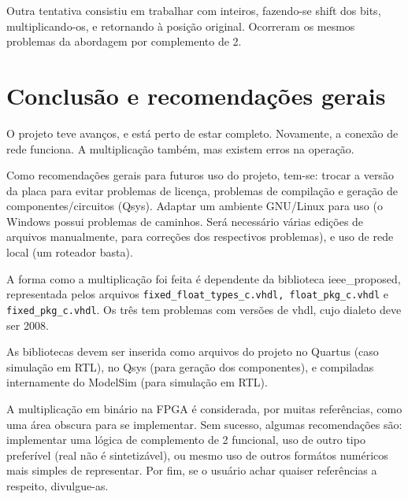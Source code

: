 \documentclass [12pt,oneside] {article}
\begin{document}
	Outra tentativa consistiu em trabalhar com inteiros,
fazendo-se shift dos bits, multiplicando-os, e retornando à posição
original. Ocorreram os mesmos problemas da abordagem por complemento
de 2.


\section{Conclusão e recomendações gerais}

	O projeto teve avanços, e está perto de estar completo.
Novamente, a conexão de rede funciona. A multiplicação também, mas
existem erros na operação.

	Como recomendações gerais para futuros uso do projeto, tem-se:
trocar a versão da placa para evitar problemas de licença, problemas
de compilação e geração de componentes/circuitos (Qsys). Adaptar um
ambiente GNU/Linux para uso (o Windows possui problemas de caminhos.
Será necessário várias edições de arquivos manualmente, para correções
dos respectivos problemas), e uso de rede local (um roteador basta).

	A forma como a multiplicação foi feita é dependente da
biblioteca ieee\_proposed, representada pelos arquivos
\texttt{fixed\_float\_types\_c.vhdl, float\_pkg\_c.vhdl} e
\texttt{fixed\_pkg\_c.vhdl}. Os três tem problemas com versões de
vhdl, cujo dialeto deve ser 2008.

	As bibliotecas devem ser inserida como arquivos do projeto no
Quartus (caso simulação em RTL), no Qsys (para geração dos
componentes), e compiladas internamente do ModelSim (para simulação em
RTL).

	A multiplicação em binário na FPGA é considerada, por muitas
referências, como uma área obscura para se implementar. Sem sucesso,
algumas recomendações são: implementar uma lógica de complemento de 2
funcional, uso de outro tipo preferível (real não é sintetizável), ou
mesmo uso de outros formátos numéricos mais simples de representar.
Por fim, se o usuário achar quaiser referências a respeito,
divulgue-as.
\end{document}

